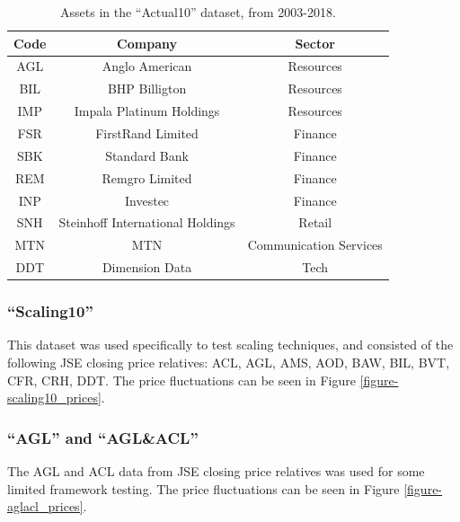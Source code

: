\documentclass[a4paper,11pt,oneside]{article}
\theoremstyle{plain}
\theoremstyle{definition}
\begin{document}
	\begin{table}[H]
		\centering
		\begin{tabular}{|c|c|c|}
			\hline
			\textbf{Code} &\textbf{Company} & \textbf{Sector} \\\hline	
			{AGL} & {Anglo American} & {Resources}  \\\hline
			{BIL} & {BHP Billigton} & {Resources}  \\\hline
			{IMP} & {Impala Platinum Holdings} & {Resources}  \\\hline
			{FSR} & {FirstRand Limited} & {Finance}  \\\hline
			{SBK} & {Standard Bank} & {Finance}  \\\hline
			{REM} & {Remgro Limited} & {Finance}  \\\hline
			{INP} & {Investec} & {Finance}  \\\hline
			{SNH} & {Steinhoff International Holdings} & {Retail}    \\\hline
			{MTN} & {MTN} & {Communication Services}  \\\hline
			{DDT} & {Dimension Data} & {Tech} \\\hline
		\end{tabular}
		\newline\newline
		\caption{Assets in the ``Actual10'' dataset, from 2003-2018. }\label{tab_actual10}
	\end{table}
	
	\subsubsection{``Scaling10''}\label{dataset_scaling10}
	
	 This dataset was used specifically to test scaling techniques, and consisted of the following JSE closing price relatives: ACL, AGL, AMS, AOD, BAW, BIL, BVT, CFR, CRH, DDT. The price fluctuations can be seen in Figure \ref{figure-scaling10_prices}.
	
	\subsubsection{``AGL'' and ``AGL\&ACL''}\label{dataset_agl}\label{dataset_aglacl}
	
	The AGL and ACL data from JSE closing price relatives was used for some limited framework testing. The price fluctuations can be seen in Figure \ref{figure-aglacl_prices}.
	
\end{document}
